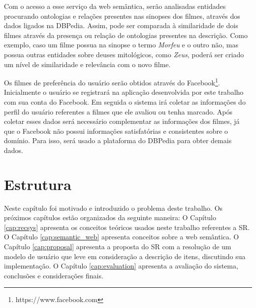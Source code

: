 Com o acesso a esse serviço da web semântica, serão analisadas entidades procurando ontologias e relações presentes nas sinopses dos filmes, através dos dados ligados na DBPedia. Assim, pode ser comparada à similaridade de dois filmes através da presença ou relação de ontologias presentes na descrição. Como exemplo, caso um filme possua na sinopse o termo \textit{Morfeu} e o outro não, mas possua outras entidades sobre deuses mitológicos, como \textit{Zeus}, poderá ser criado um nível de similaridade e relevância com o novo filme.

Os filmes de preferência do usuário serão obtidos através do Facebook\footnote{https://www.facebook.com}. Inicialmente o usuário se registrará na aplicação desenvolvida por este trabalho com sua conta do Facebook. Em seguida o sistema irá coletar as informações do perfil do usuário referentes a filmes que ele avaliou ou tenha marcado. Após coletar esses dados será necessário complementar as informações dos filmes, já que o Facebook não possui informações satisfatórias e consistentes sobre o domínio. Para isso, será usado a plataforma do DBPedia para obter demais dados.

\section{Estrutura}
Neste capítulo foi motivado e introduzido o problema deste trabalho. Os próximos capítulos estão organizados da seguinte maneira: O Capítulo \ref{cap:recsys} apresenta os conceitos teóricos usados neste trabalho referentes a SR. O Capítulo \ref{cap:semantic_web} apresenta conceitos sobre a web semântica. O Capítulo \ref{cap:proposal} apresenta a proposta do SR com a resolução de um modelo de usuário que leve em consideração a descrição de itens, discutindo sua implementação. O Capítulo \ref{cap:evaluation} apresenta a avaliação do sistema, conclusões e considerações finais.